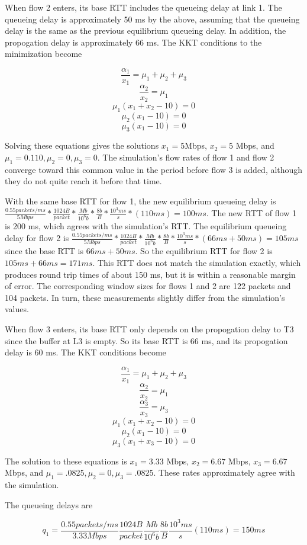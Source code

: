 \documentclass{article}
\begin{document}
When flow 2 enters, its base RTT includes the queueing delay at link 1. The queueing delay is approximately 50 ms by the above, assuming that the queueing delay is the same as the previous equilibrium queueing delay. In addition, the propogation delay is approximately 66 ms. The KKT conditions to the minimization become

$$\frac{\alpha_1}{x_1}=\mu_1+\mu_2+\mu_3$$
$$\frac{\alpha_2}{x_2}=\mu_1$$
$$\mu_1 (x_1 + x_2 - 10) = 0$$
$$\mu_2 (x_1 - 10) = 0$$
$$\mu_3 (x_1 - 10) = 0$$

Solving these equations gives the solutions $x_1 = 5$Mbps, $x_2 = 5$ Mbps, and $\mu_1 = 0.110, \mu_2 = 0, \mu_3 = 0$. The simulation's flow rates of flow 1 and flow 2 converge toward this common value in the period before flow 3 is added, although they do not quite reach it before that time.

With the same base RTT for flow 1, the new equilibrium queueing delay is  $\frac{0.55 packets/ms}{5 Mbps} * \frac{1024 B}{packet} * \frac{Mb}{10^6 b} * \frac{8 b}{B} * \frac{10^3 ms}{s} * (110 ms) = 100 ms$. The new RTT of flow 1 is 200 ms, which agrees with the simulation's RTT. The equilibrium queueing delay for flow 2 is $\frac{0.55 packets/ms}{5 Mbps} * \frac{1024 B}{packet} * \frac{Mb}{10^6 b} * \frac{8 b}{B} * \frac{10^3 ms}{s} * (66ms + 50ms) = 105 ms$ since the base RTT is $66 ms + 50 ms$. So the equilibrium RTT for flow 2 is $105ms + 66ms = 171 ms$. This RTT does not match the simulation exactly, which produces round trip times of about 150 ms, but it is within a reasonable margin of error.  The corresponding window sizes for flows 1 and 2 are 122 packets and 104 packets. In turn, these measurements slightly differ from the simulation's values.

When flow 3 enters, its base RTT only depends on the propogation delay to T3 since the buffer at L3 is empty. So its base RTT is 66 ms, and its propogation delay is 60 ms. The KKT conditions become

$$\frac{\alpha_1}{x_1}=\mu_1+\mu_2+\mu_3$$
$$\frac{\alpha_2}{x_2}=\mu_1$$
$$\frac{\alpha_3}{x_3}=\mu_3$$
$$\mu_1 (x_1 + x_2 - 10) = 0$$
$$\mu_2 (x_1 - 10) = 0$$
$$\mu_3 (x_1 + x_3 - 10) = 0$$

The solution to these equations is $x_1 = 3.33$ Mbps, $x_2 = 6.67$ Mbps, $x_3 = 6.67$ Mbps, and $\mu_1 = .0825, \mu_2 = 0, \mu_3 = .0825$. These rates approximately agree with the simulation.

The queueing delays are

$$q_1 = \frac{0.55 packets/ms}{3.33 Mbps} \frac{1024 B}{packet} \frac{Mb}{10^6 b} \frac{8 b}{B} \frac{10^3 ms}{s} (110 ms) = 150 ms$$
\end{document}
